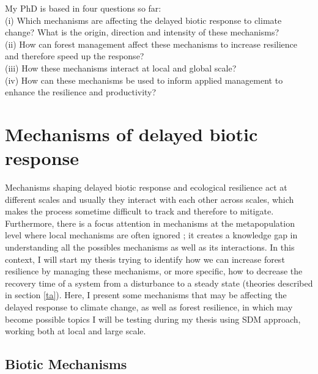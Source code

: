 My PhD is based in four questions so far: \\
(i) Which mechanisms are affecting the delayed biotic response to climate change? What is the origin, direction and intensity of these mechanisms? \\
(ii) How can forest management affect these mechanisms to increase resilience and therefore speed up the response? \\
(iii) How these mechanisms interact at local and global scale? \\
(iv) How can these mechanisms be used to inform applied management to enhance the resilience and productivity?

\section{Mechanisms of delayed biotic response}

Mechanisms shaping delayed biotic response and ecological resilience act at different scales and usually they interact with each other across scales, which makes the process sometime difficult to track and therefore to mitigate.
Furthermore, there is a focus attention in mechanisms at the metapopulation level where local mechanisms are often ignored \parencite{Hylander2013}; it creates a knowledge gap in understanding all the possibles mechanisms as well as its interactions.
In this context, I will start my thesis trying to identify how we can increase forest resilience by managing these mechanisms, or more specific, how to decrease the recovery time of a system from a disturbance to a steady state (theories described in section \ref{ta}).
Here, I present some mechanisms that may be affecting the delayed response to climate change, as well as forest resilience, in which may become possible topics I will be testing during my thesis using SDM approach, working both at local and large scale.

\subsection{Biotic Mechanisms}

